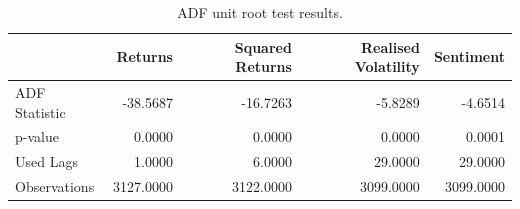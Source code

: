 \begin{table}[htbp]
\centering
\begin{tabular}{lrrrr}
\toprule
 & Returns & Squared Returns & Realised Volatility & Sentiment \\
\midrule
ADF Statistic & -38.5687 & -16.7263 & -5.8289 & -4.6514 \\
p-value & 0.0000 & 0.0000 & 0.0000 & 0.0001 \\
Used Lags & 1.0000 & 6.0000 & 29.0000 & 29.0000 \\
Observations & 3127.0000 & 3122.0000 & 3099.0000 & 3099.0000 \\
\bottomrule
\end{tabular}
\caption{ADF unit root test results.}
\label{tab:adf}
\end{table}

